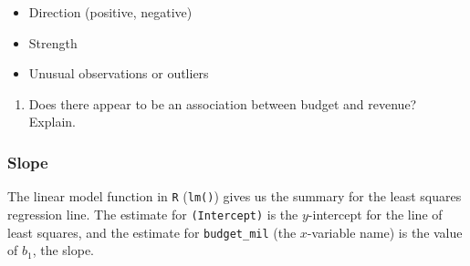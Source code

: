 \documentclass[
]{report}
\newenvironment{Shaded}{\begin{snugshade}}{\end{snugshade}}
\newcommand{\AttributeTok}[1]{\textcolor[rgb]{0.77,0.63,0.00}{#1}}
\newcommand{\CommentTok}[1]{\textcolor[rgb]{0.56,0.35,0.01}{\textit{#1}}}
\newcommand{\FunctionTok}[1]{\textcolor[rgb]{0.00,0.00,0.00}{#1}}
\newcommand{\NormalTok}[1]{#1}
\newcommand{\OtherTok}[1]{\textcolor[rgb]{0.56,0.35,0.01}{#1}}
\newcommand{\SpecialCharTok}[1]{\textcolor[rgb]{0.00,0.00,0.00}{#1}}
\providecommand{\tightlist}{%
  \setlength{\itemsep}{0pt}\setlength{\parskip}{0pt}}
\begin{document}
\vspace{.4in}

\begin{itemize}
\tightlist
\item
  Direction (positive, negative)
\end{itemize}

\vspace{.4in}

\begin{itemize}
\tightlist
\item
  Strength
\end{itemize}

\vspace{.4in}

\begin{itemize}
\tightlist
\item
  Unusual observations or outliers
\end{itemize}

\vspace{.4in}

\begin{enumerate}
\def\labelenumi{\arabic{enumi}.}
\setcounter{enumi}{4}
\tightlist
\item
  Does there appear to be an association between budget and revenue? Explain.
\end{enumerate}

\vspace{1in}

\newpage

\hypertarget{slope}{%
\subsubsection*{Slope}\label{slope}}

The linear model function in \texttt{R} (\texttt{lm()}) gives us the summary for the least squares regression line. The estimate for \texttt{(Intercept)} is the \(y\)-intercept for the line of least squares, and the estimate for \texttt{budget\_mil} (the \(x\)-variable name) is the value of \(b_1\), the slope.

\begin{Shaded}
\end{Shaded}
\end{document}
